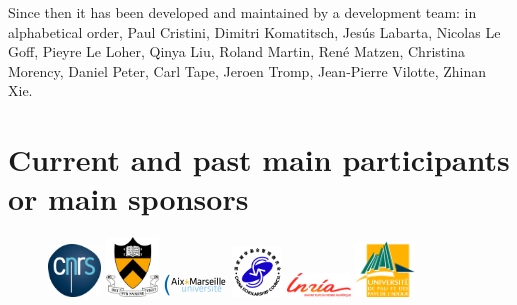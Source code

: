 \documentclass[oneside,english,onecolumn,letterpaper]{book}
\begin{document}
Since then it has been developed and maintained by a development team: in alphabetical order,
Paul Cristini,
Dimitri Komatitsch,
Jes\'us Labarta,
Nicolas Le Goff,
Pieyre Le Loher,
Qinya Liu,
Roland Martin,
Ren\'e Matzen,
Christina Morency,
Daniel Peter,
Carl Tape,
Jeroen Tromp,
Jean-Pierre Vilotte,
Zhinan Xie.

\section*{Current and past main participants or main sponsors}

\begin{figure}[htbp]
\begin{center}
\includegraphics[width=0.125\textwidth]{figures/logo_cnrs}
\includegraphics[width=0.125\textwidth]{figures/logo_princeton}
\includegraphics[width=0.15\textwidth]{figures/logo_aix_marseille_universite}
\includegraphics[width=0.12\textwidth]{figures/logo_CSC_China}
\includegraphics[width=0.15\textwidth]{figures/logo_inria}
\includegraphics[width=0.14\textwidth]{figures/logo_UPPA}
\end{center}

\vspace*{2truemm}


\end{figure}
\end{document}
